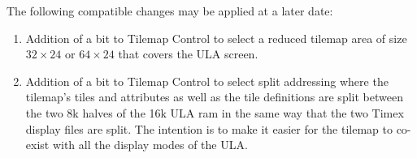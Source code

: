The following compatible changes may be applied at a later date:

\begin{enumerate}
\item Addition of a bit to Tilemap Control to select a reduced tilemap
  area of size $32\times24$ or $64\times24$ that covers the ULA
  screen.
\item Addition of a bit to Tilemap Control to select split addressing
  where the tilemap’s tiles and attributes as well as the tile
  definitions are split between the two 8k halves of the 16k ULA ram
  in the same way that the two Timex display files are split. The
  intention is to make it easier for the tilemap to co-exist with all
  the display modes of the ULA.
\end{enumerate}
